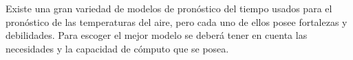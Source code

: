 Existe una gran variedad de modelos de pronóstico del tiempo usados para el pronóstico de las temperaturas del aire, pero cada uno de ellos posee fortalezas y debilidades. Para escoger el mejor modelo se deberá tener en cuenta las necesidades y la capacidad de cómputo que se posea.\\





